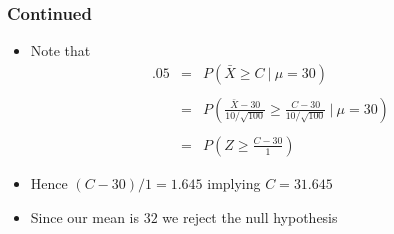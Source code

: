\documentclass[aspectratio=169]{beamer}
\begin{document}
\begin{frame}\frametitle{Continued}
\begin{itemize}
\item Note that 
  \begin{eqnarray*}
    .05 & = & P\left(\bar X \geq C ~|~ \mu = 30 \right) \\ \\
        & = & P\left(\frac{\bar X - 30}{10 / \sqrt{100}} \geq \frac{C - 30}{10/\sqrt{100}} ~|~ \mu = 30\right) \\ \\
        & = & P\left(Z \geq \frac{C - 30}{1}\right)
  \end{eqnarray*}
\item Hence $(C - 30) / 1 = 1.645$ implying $C = 31.645$
\item Since our mean is $32$ we reject the null hypothesis
\end{itemize}
\end{frame}
\end{document}
